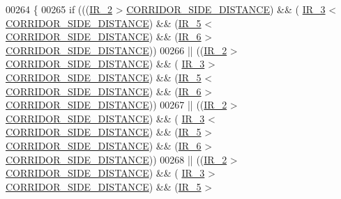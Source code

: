 \begin{DoxyCode}
00264         \{
00265             \textcolor{keywordflow}{if} (((\hyperlink{state__machine_8c_a07cfb2e201909d017a88a2a86c32cd4b}{IR\_2} > \hyperlink{state__machine_8c_a201d56046ddf552d57b4862e0ec07a10}{CORRIDOR\_SIDE\_DISTANCE}) && (
      \hyperlink{state__machine_8c_a7831b71dc250258ecefe0e23f9920688}{IR\_3} < \hyperlink{state__machine_8c_a201d56046ddf552d57b4862e0ec07a10}{CORRIDOR\_SIDE\_DISTANCE}) && (\hyperlink{state__machine_8c_ad00ba6cc1cf461bda7059f5aafc06142}{IR\_5} < 
      \hyperlink{state__machine_8c_a201d56046ddf552d57b4862e0ec07a10}{CORRIDOR\_SIDE\_DISTANCE}) && (\hyperlink{state__machine_8c_a8c51bcd8b555e8c78fea79b88d28b55e}{IR\_6} > 
      \hyperlink{state__machine_8c_a201d56046ddf552d57b4862e0ec07a10}{CORRIDOR\_SIDE\_DISTANCE}))
00266              || ((\hyperlink{state__machine_8c_a07cfb2e201909d017a88a2a86c32cd4b}{IR\_2} > \hyperlink{state__machine_8c_a201d56046ddf552d57b4862e0ec07a10}{CORRIDOR\_SIDE\_DISTANCE}) && (
      \hyperlink{state__machine_8c_a7831b71dc250258ecefe0e23f9920688}{IR\_3} > \hyperlink{state__machine_8c_a201d56046ddf552d57b4862e0ec07a10}{CORRIDOR\_SIDE\_DISTANCE}) && (\hyperlink{state__machine_8c_ad00ba6cc1cf461bda7059f5aafc06142}{IR\_5} < 
      \hyperlink{state__machine_8c_a201d56046ddf552d57b4862e0ec07a10}{CORRIDOR\_SIDE\_DISTANCE}) && (\hyperlink{state__machine_8c_a8c51bcd8b555e8c78fea79b88d28b55e}{IR\_6} > 
      \hyperlink{state__machine_8c_a201d56046ddf552d57b4862e0ec07a10}{CORRIDOR\_SIDE\_DISTANCE}))
00267              || ((\hyperlink{state__machine_8c_a07cfb2e201909d017a88a2a86c32cd4b}{IR\_2} > \hyperlink{state__machine_8c_a201d56046ddf552d57b4862e0ec07a10}{CORRIDOR\_SIDE\_DISTANCE}) && (
      \hyperlink{state__machine_8c_a7831b71dc250258ecefe0e23f9920688}{IR\_3} < \hyperlink{state__machine_8c_a201d56046ddf552d57b4862e0ec07a10}{CORRIDOR\_SIDE\_DISTANCE}) && (\hyperlink{state__machine_8c_ad00ba6cc1cf461bda7059f5aafc06142}{IR\_5} > 
      \hyperlink{state__machine_8c_a201d56046ddf552d57b4862e0ec07a10}{CORRIDOR\_SIDE\_DISTANCE}) && (\hyperlink{state__machine_8c_a8c51bcd8b555e8c78fea79b88d28b55e}{IR\_6} > 
      \hyperlink{state__machine_8c_a201d56046ddf552d57b4862e0ec07a10}{CORRIDOR\_SIDE\_DISTANCE}))
00268              || ((\hyperlink{state__machine_8c_a07cfb2e201909d017a88a2a86c32cd4b}{IR\_2} > \hyperlink{state__machine_8c_a201d56046ddf552d57b4862e0ec07a10}{CORRIDOR\_SIDE\_DISTANCE}) && (
      \hyperlink{state__machine_8c_a7831b71dc250258ecefe0e23f9920688}{IR\_3} > \hyperlink{state__machine_8c_a201d56046ddf552d57b4862e0ec07a10}{CORRIDOR\_SIDE\_DISTANCE}) && (\hyperlink{state__machine_8c_ad00ba6cc1cf461bda7059f5aafc06142}{IR\_5} > 

\end{DoxyCode}

